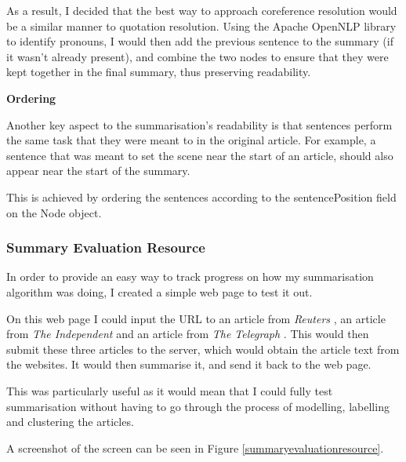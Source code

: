 \documentclass[12pt]{article}
\begin{document}
As a result, I decided that the best way to approach coreference resolution would be a similar manner to quotation resolution. Using the Apache OpenNLP \cite{opennlp} library to identify pronouns, I would then add the previous sentence to the summary (if it wasn't already present), and combine the two nodes to ensure that they were kept together in the final summary, thus preserving readability.

\textbf{Ordering}

Another key aspect to the summarisation's readability is that sentences perform the same task that they were meant to in the original article. For example, a sentence that was meant to set the scene near the start of an article, should also appear near the start of the summary. 

This is achieved by ordering the sentences according to the sentencePosition field on the Node object. 

\subsubsection{Summary Evaluation Resource}

In order to provide an easy way to track progress on how my summarisation algorithm was doing, I created a simple web page to test it out. 

On this web page I could input the URL to an article from \emph{Reuters} \cite{reuters}, an article from \emph{The Independent} \cite{independent} and an article from \emph{The Telegraph} \cite{telegraph}. This would then submit these three articles to the server, which would obtain the article text from the websites. It would then summarise it, and send it back to the web page.

This was particularly useful as it would mean that I could fully test summarisation without having to go through the process of modelling, labelling and clustering the articles.

A screenshot of the screen can be seen in Figure \ref{summaryevaluationresource}.
\end{document}
